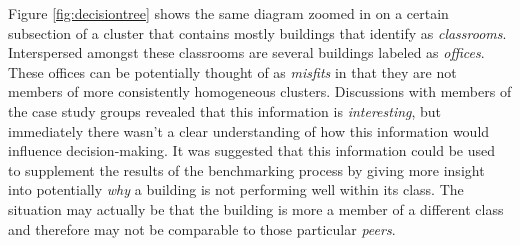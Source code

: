 Figure \ref{fig:decisiontree} shows the same diagram zoomed in on a certain subsection of a cluster that contains mostly buildings that identify as \emph{classrooms}. Interspersed amongst these classrooms are several buildings labeled as \emph{offices}. These offices can be potentially thought of as \emph{misfits} in that they are not members of more consistently homogeneous clusters. Discussions with members of the case study groups revealed that this information is \emph{interesting}, but immediately there wasn't a clear understanding of how this information would influence decision-making. It was suggested that this information could be used to supplement the results of the benchmarking process by giving more insight into potentially \emph{why} a building is not performing well within its class. The situation may actually be that the building is more a member of a different class and therefore may not be comparable to those particular \emph{peers}.